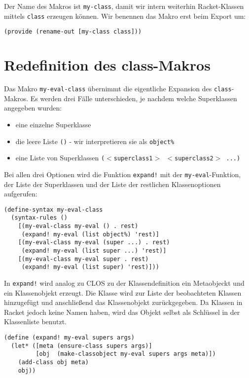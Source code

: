 Der Name des Makros ist \texttt{my-class}, damit wir intern weiterhin Racket-Klassen mittels \texttt{class} erzeugen können. Wir benennen das Makro erst beim Export um:

\begin{lstlisting}
(provide (rename-out [my-class class]))
\end{lstlisting}

\section{Redefinition des class-Makros}
Das Makro \texttt{my-eval-class} übernimmt die eigentliche Expansion des \texttt{class}-Makros. Es werden drei Fälle unterschieden, je nachdem welche Superklassen angegeben wurden:
\begin{itemize}
 \item eine einzelne Superklasse 
 \item die leere Liste \texttt{()} - wir interpretieren sie als \texttt{object\%}
 \item eine Liste von Superklassen \texttt{($<$superclass1$>$ $<$superclass2$>$ ...)}
\end{itemize}

Bei allen drei Optionen wird die Funktion \texttt{expand!} mit der \texttt{my-eval}-Funktion, der Liste der Superklassen und der Liste der restlichen Klassenoptionen aufgerufen:

\begin{lstlisting}
(define-syntax my-eval-class
  (syntax-rules ()
    [(my-eval-class my-eval () . rest) 
     (expand! my-eval (list object%) 'rest)]
    [(my-eval-class my-eval (super ...) . rest)
     (expand! my-eval (list super ...) 'rest)]
    [(my-eval-class my-eval super . rest)
     (expand! my-eval (list super) 'rest)]))
\end{lstlisting}

In \texttt{expand!} wird analog zu CLOS zu der Klassendefinition ein Metaobjeckt und ein Klassenobjekt erzeugt. Die Klasse wird zur Liste der beobachteten Klassen hinzugefügt und anschließend das Klassenobjekt zurückgegeben. Da Klassen in Racket jedoch keine Namen haben, wird das Objekt selbst als Schlüssel in der Klassenliste benutzt.

\begin{lstlisting}
(define (expand! my-eval supers args)
  (let* ([meta (ensure-class supers args)]
         [obj  (make-classobject my-eval supers args meta)])
    (add-class obj meta)
    obj))
\end{lstlisting}

